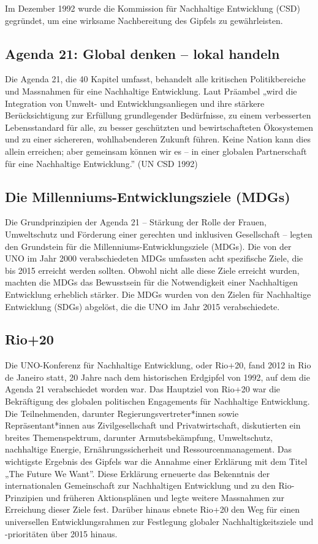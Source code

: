 \documentclass[
  nswissgerman,
  a4paper,
  openany]{book}
\begin{document}
Im Dezember 1992 wurde die Kommission für Nachhaltige Entwicklung (CSD)
gegründet, um eine wirksame Nachbereitung des Gipfels zu gewährleisten.

\subsection{Agenda 21: Global denken -- lokal
handeln}\label{agenda-21-global-denken-lokal-handeln}

Die Agenda 21, die 40 Kapitel umfasst, behandelt alle kritischen
Politikbereiche und Massnahmen für eine Nachhaltige Entwicklung. Laut
Präambel „wird die Integration von Umwelt- und Entwicklungsanliegen und
ihre stärkere Berücksichtigung zur Erfüllung grundlegender Bedürfnisse,
zu einem verbesserten Lebensstandard für alle, zu besser geschützten und
bewirtschafteten Ökosystemen und zu einer sichereren, wohlhabenderen
Zukunft führen. Keine Nation kann dies allein erreichen; aber gemeinsam
können wir es -- in einer globalen Partnerschaft für eine Nachhaltige
Entwicklung.'' (UN CSD 1992)

\subsection{Die Millenniums-Entwicklungsziele
(MDGs)}\label{die-millenniums-entwicklungsziele-mdgs}

Die Grundprinzipien der Agenda 21 -- Stärkung der Rolle der Frauen,
Umweltschutz und Förderung einer gerechten und inklusiven Gesellschaft
-- legten den Grundstein für die Millenniums-Entwicklungsziele (MDGs).
Die von der UNO im Jahr 2000 verabschiedeten MDGs umfassten acht
spezifische Ziele, die bis 2015 erreicht werden sollten. Obwohl nicht
alle diese Ziele erreicht wurden, machten die MDGs das Bewusstsein für
die Notwendigkeit einer Nachhaltigen Entwicklung erheblich stärker. Die
MDGs wurden von den Zielen für Nachhaltige Entwicklung (SDGs) abgelöst,
die die UNO im Jahr 2015 verabschiedete.

\subsection{Rio+20}\label{rio20}

Die UNO-Konferenz für Nachhaltige Entwicklung, oder Rio+20, fand 2012 in
Rio de Janeiro statt, 20 Jahre nach dem historischen Erdgipfel von 1992,
auf dem die Agenda 21 verabschiedet worden war. Das Hauptziel von Rio+20
war die Bekräftigung des globalen politischen Engagements für
Nachhaltige Entwicklung. Die Teilnehmenden, darunter
Regierungsvertreter*innen sowie Repräsentant*innen aus Zivilgesellschaft
und Privatwirtschaft, diskutierten ein breites Themenspektrum, darunter
Armutsbekämpfung, Umweltschutz, nachhaltige Energie,
Ernährungssicherheit und Ressourcenmanagement. Das wichtigste Ergebnis
des Gipfels war die Annahme einer Erklärung mit dem Titel „The Future We
Want''. Diese Erklärung erneuerte das Bekenntnis der internationalen
Gemeinschaft zur Nachhaltigen Entwicklung und zu den Rio-Prinzipien und
früheren Aktionsplänen und legte weitere Massnahmen zur Erreichung
dieser Ziele fest. Darüber hinaus ebnete Rio+20 den Weg für einen
universellen Entwicklungsrahmen zur Festlegung globaler
Nachhaltigkeitsziele und -prioritäten über 2015 hinaus.
\end{document}
